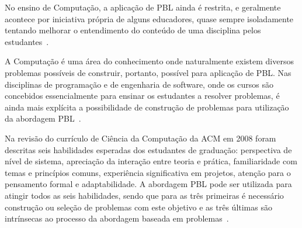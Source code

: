 No ensino de Computação, a aplicação de PBL ainda é restrita, e geralmente
acontece por iniciativa própria de alguns educadores,
quase sempre isoladamente tentando melhorar o
entendimento do conteúdo de uma disciplina
pelos estudantes~\cite{wood2003problem, o2012practical}.

A Computação é uma área do conhecimento onde naturalmente existem
diversos problemas possíveis de construir, portanto, possível para
aplicação de PBL.
Nas disciplinas de programação e de engenharia de software, onde os
cursos são concebidos essencialmente para ensinar os estudantes
a resolver problemas, é ainda mais explícita a possibilidade
de construção de problemas para utilização da abordagem
PBL~\cite{fee2010teaching}.

Na revisão do currículo de Ciência da Computação da ACM em 2008
foram descritas seis habilidades esperadas dos estudantes
de graduação: perspectiva de nível de sistema,
apreciação da interação entre teoria e prática,
familiaridade com temas e princípios comuns,
experiência significativa em projetos,
atenção para o pensamento formal e
adaptabilidade.
A abordagem PBL pode ser utilizada para atingir
todos as seis habilidades, sendo que para as três primeiras
é necessário construção ou seleção de problemas com este objetivo e 
as três últimas são intrínsecas ao processo da abordagem baseada
em problemas~\cite{cassel2008computer}.
